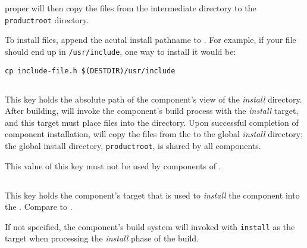 \lmsbw proper will then copy the files from the intermediate directory
to the \texttt{productroot} directory.

To install files, append the acutal install pathname to \destdir.  For
example, if your file should end up in \texttt{/usr/include}, one way
to install it would be:

\begin{verbatim}
cp include-file.h $(DESTDIR)/usr/include
\end{verbatim}


\subsection{}\label{variables:install-directory}

This key holds the absolute path of the component's view of the
\emph{install} directory.  After building, \lmsbw will invoke the
component's build process with the \emph{install} target, and this
target must place files into the \destdir directory.  Upon successful
completion of component installation, \lmsbw will copy the files from
the \destdir to the global \emph{install} directory; the global
install directory, \texttt{productroot}, is shared by all components.

This value of this key must not be used by components of \lmsbw.


\subsection{}\label{variables:install-target}

This key holds the component's \makefile target that is used to
\emph{install} the component into the \destdir.  Compare to
.

If not specified, the component's build system will invoked with
\texttt{install} as the target when processing the \emph{install}
phase of the build.

\label{variables:install-target}

\subsection{}\label{variables:kind}

